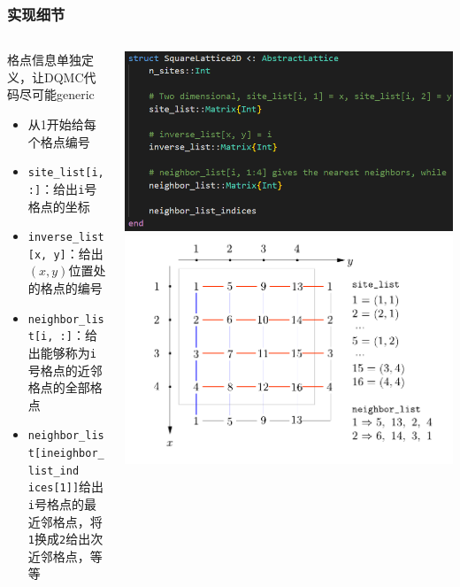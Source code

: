 \documentclass[UTF8]{ctexbeamer}
\begin{document}
\begin{frame}
\frametitle{实现细节}

\begin{columns}

\begin{column}{0.6\textwidth}
    格点信息单独定义，让DQMC代码尽可能generic
    \begin{itemize}
        \item 从1开始给每个格点编号
        \item \texttt{site\_list[i, :]}：给出\texttt{i}号格点的坐标
        \item \texttt{inverse\_list[x, y]}：给出$(x, y)$位置处的格点的编号
        \item \texttt{neighbor\_list[i, :]}：给出能够称为\texttt{i}号格点的近邻格点的全部格点
        \item \texttt{neighbor\_list[ineighbor\_list\_ind\\ices[1]]}给出\texttt{i}号格点的最近邻格点，将\texttt{1}换成\texttt{2}给出次近邻格点，等等
    \end{itemize}
\end{column}

\begin{column}{0.4\textwidth}
    \includegraphics[width=\textwidth]{lattice-def.PNG}
    \includegraphics[width=\textwidth]{lattice-indexation.pdf}
\end{column}

\end{columns}    

\end{frame}
\end{document}
